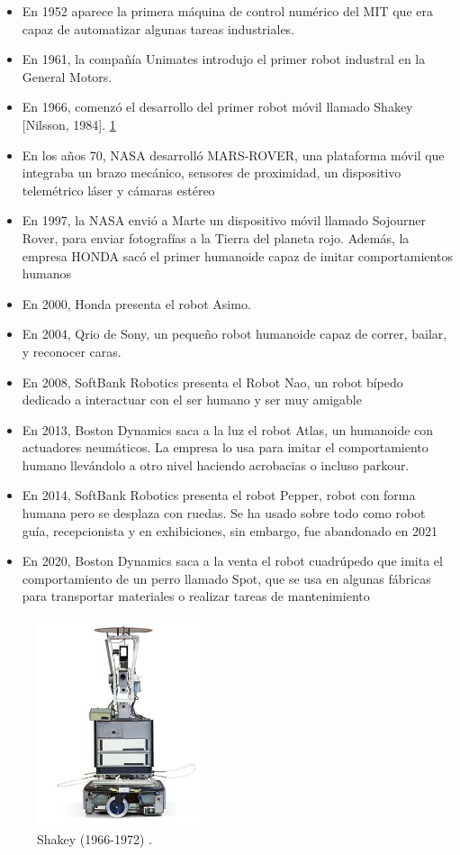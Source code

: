 \begin {itemize}
	\item En 1952 aparece la primera máquina de control numérico del MIT que era capaz de automatizar algunas tareas industriales.
	\item En 1961, la compañía Unimates introdujo el primer robot industral en la General Motors.
	\item En 1966, comenzó el desarrollo del primer robot móvil llamado Shakey [Nilsson, 1984]. \ref{fig:shakey}
	\item En los años 70, NASA desarrolló MARS-ROVER, una plataforma móvil que integraba un brazo mecánico, sensores de proximidad, un dispositivo telemétrico láser y cámaras estéreo
	\item En 1997, la NASA envió a Marte un dispositivo móvil llamado Sojourner Rover, para enviar fotografías a la Tierra del planeta rojo. Además, la empresa HONDA sacó el primer humanoide capaz de imitar comportamientos humanos
	\item En 2000, Honda presenta el robot Asimo.
	\item En 2004, Qrio de Sony, un pequeño robot humanoide capaz de correr, bailar, y reconocer caras.
	\item En 2008, SoftBank Robotics presenta el Robot Nao, un robot bípedo dedicado a interactuar con el ser humano y ser muy amigable
	\item En 2013, Boston Dynamics saca a la luz el robot Atlas, un humanoide con actuadores neumáticos. La empresa lo usa para imitar el comportamiento humano llevándolo a otro nivel haciendo acrobacias o incluso parkour.
	\item En 2014, SoftBank Robotics presenta el robot Pepper, robot con forma humana pero se desplaza con ruedas. Se ha usado sobre todo como robot guía, recepcionista y en exhibiciones, sin embargo, fue abandonado en 2021
	\item En 2020, Boston Dynamics saca a la venta el robot cuadrúpedo que imita el comportamiento de un perro llamado Spot, que se usa en algunas fábricas para transportar materiales o realizar tareas de mantenimiento
\end{itemize}

\begin{figure} [h!]
  \begin{center}
    \includegraphics[width=5cm]{imagenes/shakey.jpg}
  \end{center}
  \caption[Shakey (1966-1972)]{Shakey (1966-1972) \cite{shakey-the-robot}.}
  \label{fig:shakey}
\end{figure}\




